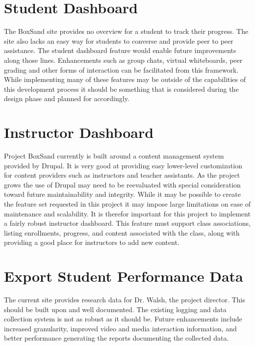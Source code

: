 \documentclass[10pt,journal,compsoc,draftclsnofoot,onecolumn]{IEEEtran}
\begin{document}
\section{Student Dashboard}
The BoxSand site provides no overview for a student to track their progress. The site also lacks an easy way for students to converse and provide peer to peer assistance. The student dashboard feature would enable future improvements along those lines. Enhancements such as group chats, virtual whiteboards, peer grading and other forms of interaction can be facilitated from this framework. While implementing many of these features may be outside of the capabilities of this development process it should be something that is considered during the design phase and planned for accordingly. 

\section{Instructor Dashboard}
Project BoxSand currently is built around a content management system provided by Drupal. It is very good at providing easy lower-level customization for content providers such as instructors and teacher assistants. As the project grows the use of Drupal may need to be reevaluated with special consideration toward future maintainability and integrity. While it may be possible to create the feature set requested in this project it may impose large limitations on ease of maintenance and scalability. It is therefor important for this project to implement a fairly robust instructor dashboard. This feature must support class associations, listing enrollments, progress, and content associated with the class, along with providing a good place for instructors to add new content. 

\section{Export Student Performance Data}
The current site provides research data for Dr. Walsh, the project director. This should be built upon and well documented. The existing logging and data collection system is not as robust as it should be. Future enhancements include increased granularity, improved video and media interaction information, and better performance generating the reports documenting the collected data. 
\end{document}
